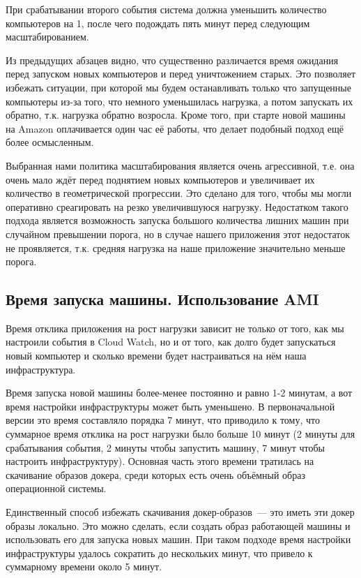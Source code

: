 	При срабатывании второго события система должна уменьшить количество компьютеров на 1, после чего подождать пять минут перед следующим масштабированием.

	Из предыдущих абзацев видно, что существенно различается время ожидания перед запуском новых компьютеров и перед уничтожением старых. Это позволяет избежать ситуации, при которой мы будем останавливать только что запущенные компьютеры из-за того, что немного уменьшилась нагрузка, а потом запускать их обратно, т.к. нагрузка обратно возросла. Кроме того, при старте новой машины на Amazon оплачивается один час её работы, что делает подобный подход ещё более осмысленным.
	
	Выбранная нами политика масштабирования является очень агрессивной, т.е. она очень мало ждёт перед поднятием новых компьютеров и увеличивает их количество в геометрической прогрессии. Это сделано для того, чтобы мы могли оперативно среагировать на резко увеличившуюся нагрузку. Недостатком такого подхода является возможность запуска большого количества лишних машин при случайном превышении порога, но в случае нашего приложения этот недостаток не проявляется, т.к. средняя нагрузка на наше приложение значительно меньше порога.
	
\subsection{Время запуска машины. Использование AMI}
	Время отклика приложения на рост нагрузки зависит не только от того, как мы настроили события в Cloud Watch, но и от того, как долго будет запускаться новый компьютер и сколько времени будет настраиваться на нём наша инфраструктура. 
	
	Время запуска новой машины более-менее постоянно и равно 1-2 минутам, а вот время настройки инфраструктуры может быть уменьшено. В первоначальной версии это время составляло порядка 7 минут, что приводило к тому, что суммарное время отклика на рост нагрузки было больше 10 минут (2 минуты для срабатывания события, 2 минуты чтобы запустить машину, 7 минут чтобы настроить инфраструктуру). Основная часть этого времени тратилась на скачивание образов докера, среди которых есть очень объёмный образ операционной системы.
	
	Единственный способ избежать скачивания докер-образов~--- это иметь эти докер образы локально. Это можно сделать, если создать образ работающей машины и использовать его для запуска новых машин. При таком подходе время настройки инфраструктуры удалось сократить до нескольких минут, что привело к суммарному времени около 5 минут. 
